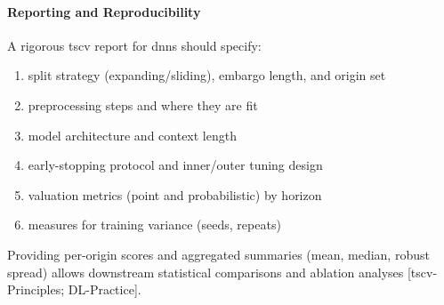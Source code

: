 \paragraph{Reporting and Reproducibility}

A rigorous \acrshort{tscv} report for \acrshort{dnn}s should specify: 


\begin{enumerate}[label=\roman*.]

\item split strategy (expanding/sliding), embargo length, and origin set
\item preprocessing steps and where they are fit
\item model architecture and context length
\item early-stopping protocol and inner/outer tuning design
\item valuation metrics (point and probabilistic) by horizon
\item measures for training variance (seeds, repeats)

\end{enumerate}

Providing per-origin scores and aggregated summaries (mean, median, robust spread) allows downstream statistical comparisons and ablation analyses [\acrshort{tscv}-Principles; DL-Practice].
